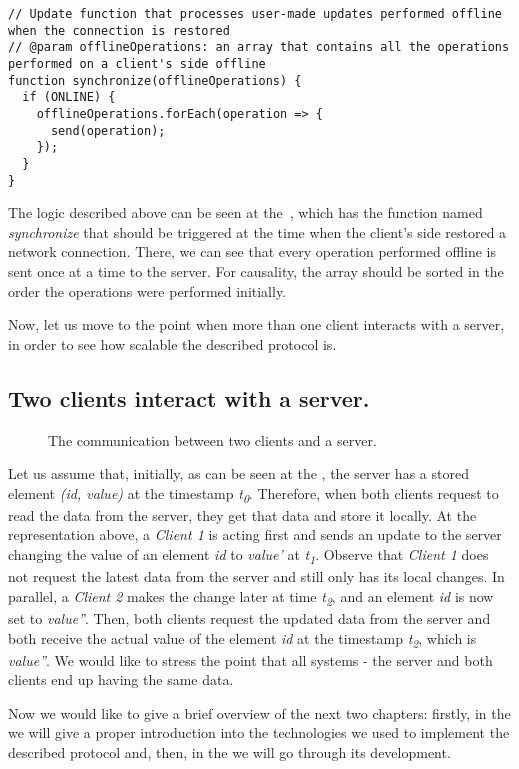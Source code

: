 \begin{lstlisting}[caption={Pseudocode for sending offline performed operations to the server: client.}, label={lst:offline}]
// Update function that processes user-made updates performed offline when the connection is restored
// @param offlineOperations: an array that contains all the operations performed on a client's side offline
function synchronize(offlineOperations) {
  if (ONLINE) {
    offlineOperations.forEach(operation => {
      send(operation);
    });
  }
}
\end{lstlisting} 

The logic described above can be seen at the~, which has the function named \textit{synchronize} that should be triggered at the time when the client's side restored a network connection. There, we can see that every operation performed offline is sent once at a time to the server. For causality, the array should be sorted in the order the operations were performed initially.

Now, let us move to the point when more than one client interacts with a server, in order to see how scalable the described protocol is.

\subsection*{Two clients interact with a server.}

\begin{figure}[!htb]
    \begin{center}
    \def\svgwidth{\linewidth}
    
    \caption {The communication between two clients and a server.}
    \label{fig:design5}
\end{center}
\end{figure}

Let us assume that, initially, as can be seen at the , the server has a stored element \textit{(id, value)} at the timestamp \textit{t\textsubscript{0}}. Therefore, when both clients request to read the data from the server, they get that data and store it locally. At the representation above, a \textit{Client 1} is acting first and sends an update to the server changing the value of an element \textit{id} to \textit{value'} at \textit{t\textsubscript{1}}. Observe that \textit{Client 1} does not request the latest data from the server and still only has its local changes. In parallel, a \textit{Client 2} makes the change later at time \textit{t\textsubscript{2}}, and an element \textit{id} is now set to \textit{value''}. Then, both clients request the updated data from the server and both receive the actual value of the element \textit{id} at the timestamp \textit{t\textsubscript{2}}, which is \textit{value''}. We would like to stress the point that all systems - the server and both clients end up having the same data.

Now we would like to give a brief overview of the next two chapters: firstly, in the  we will give a proper introduction into the technologies we used to implement the described protocol and, then, in the  we will go through its development.